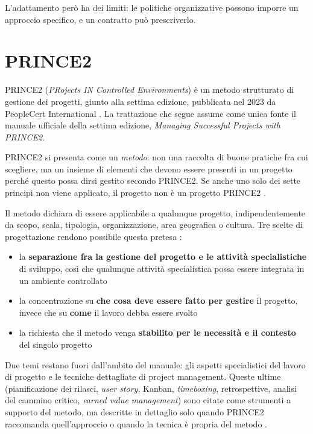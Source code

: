 L'adattamento per\`o ha dei limiti: le politiche organizzative possono imporre un
approccio specifico, e un contratto pu\`o prescriverlo.


\newpage
\section{PRINCE2}

PRINCE2 (\emph{PRojects IN Controlled Environments}) \`e un metodo strutturato
di gestione dei progetti, giunto alla settima edizione, pubblicata nel 2023 da
PeopleCert International \cite{prince27}. La trattazione che
segue assume come unica fonte il manuale ufficiale della settima edizione,
\emph{Managing Successful Projects with PRINCE2}.

PRINCE2 si presenta come un \emph{metodo}: non una raccolta di buone pratiche
fra cui scegliere, ma un insieme di elementi che devono essere presenti in un
progetto perch\'e questo possa dirsi gestito secondo PRINCE2. Se anche uno solo
dei sette principi non viene applicato, il progetto non \`e un progetto PRINCE2
\cite{prince27}.

Il metodo dichiara di essere applicabile a qualunque progetto, indipendentemente
da scopo, scala, tipologia, organizzazione, area geografica o cultura. Tre
scelte di progettazione rendono possibile questa pretesa \cite{prince27}:
\begin {itemize}
\item la \textbf{separazione fra la gestione del progetto e le attivit\`a
specialistiche} di sviluppo, cos\`i che qualunque attivit\`a specialistica possa
essere integrata in un ambiente controllato
\item la concentrazione su \textbf{che cosa deve essere fatto per gestire} il
progetto, invece che su \textbf{come} il lavoro debba essere svolto
\item la richiesta che il metodo venga \textbf{stabilito per le necessit\`a e il
contesto} del singolo progetto
\end {itemize}

Due temi restano fuori dall'ambito del manuale: gli aspetti specialistici del
lavoro di progetto e le tecniche dettagliate di project management. Queste
ultime (pianificazione dei rilasci, \emph{user story}, Kanban,
\emph{timeboxing}, retrospettive, analisi del cammino critico, \emph{earned
value management}) sono citate come strumenti a supporto del metodo, ma
descritte in dettaglio solo quando PRINCE2 raccomanda quell'approccio o quando
la tecnica \`e propria del metodo \cite{prince27}.

